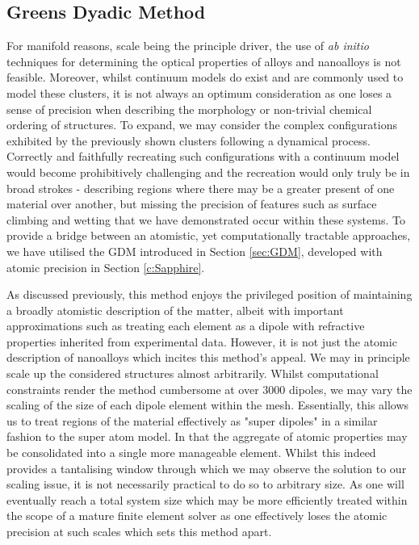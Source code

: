 \subsection{Greens Dyadic Method}
\label{DFT:GDM}
For manifold reasons, scale being the principle driver, the use of \textit{ab initio} techniques for determining the optical properties of alloys and nanoalloys is not feasible. Moreover, whilst continuum models do exist and are commonly used to model these clusters, it is not always an optimum consideration as one loses a sense of precision when describing the morphology or non-trivial chemical ordering of structures. To expand, we may consider the complex configurations exhibited by the previously shown clusters following a dynamical process. Correctly and faithfully recreating such configurations with a continuum model would become prohibitively challenging and the recreation would only truly be in broad strokes - describing regions where there may be a greater present of one material over another, but missing the precision of features such as surface climbing and wetting that we have demonstrated occur within these systems. To provide a bridge between an atomistic, yet computationally tractable approaches, we have utilised the GDM introduced in Section \ref{sec:GDM}, developed with atomic precision in Section \ref{c:Sapphire}.

As discussed previously, this method enjoys the privileged position of maintaining a broadly atomistic description of the matter, albeit with important approximations such as treating each element as a dipole with refractive properties inherited from experimental data. However, it is not just the atomic description of nanoalloys which incites this method's appeal. We may in principle scale up the considered structures almost arbitrarily. Whilst computational constraints render the method cumbersome at over 3000 dipoles, we may vary the scaling of the size of each dipole element within the mesh. Essentially, this allows us to treat regions of the material effectively as "super dipoles" in a similar fashion to the super atom model. In that the aggregate of atomic properties may be consolidated into a single more manageable element. Whilst this indeed provides a tantalising window through which we may observe the solution to our scaling issue, it is not necessarily practical to do so to arbitrary size. As one will eventually reach a total system size which may be more efficiently treated within the scope of a mature finite element solver as one effectively loses the atomic precision at such scales which sets this method apart.


